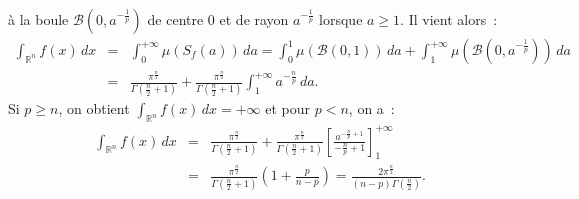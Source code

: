 {\begin{enumerate}
{\`a la boule $\mathcal{B}(0, a^{-\frac{1}{p}})$ de centre 0 et de
rayon $a^{-\frac{1}{p}}$ lorsque $a\geq 1$. Il vient alors~:
\begin{eqnarray*}
\int_{\mathbb{R}^{n}} f(x)\,dx &=& \int_{0}^{+\infty}
\mu\left(S_{f}(a)\right)\,da = \int_{0}^{1}
\mu\left(\mathcal{B}(0,1) \right)\,da + \int_{1}^{+\infty}
\mu\left(\mathcal{B}(0, a^{-\frac{1}{p}})\right)\,da\\
& = & \frac{\pi^{\frac{n}{2}}}{\Gamma\left(\frac{n}{2}+1\right)} +
\frac{\pi^{\frac{n}{2}}}{\Gamma\left(\frac{n}{2}+1\right)}\int_{1}^{+\infty}
a^{-\frac{n}{p}}\,da.
\end{eqnarray*}
Si $p\geq n$, on obtient $\int_{\mathbb{R}^{n}} f(x)\,dx =+\infty$
et pour $p<n$, on a~:
\begin{eqnarray*}
\int_{\mathbb{R}^{n}} f(x)\,dx & =
&\frac{\pi^{\frac{n}{2}}}{\Gamma\left(\frac{n}{2}+1\right)} +
\frac{\pi^{\frac{n}{2}}}{\Gamma\left(\frac{n}{2}+1\right)}\left[\frac{a^{-\frac{n}{p}+1}}{-\frac{n}{p}+1}\right]_{1}^{+\infty}\\
&=&\frac{\pi^{\frac{n}{2}}}{\Gamma\left(\frac{n}{2}+1\right)}\left(1
+ \frac{p}{n-p} \right) = \frac{2\pi^{\frac{n}{2}}}{(n -
p)\Gamma\left(\frac{n}{2}\right)}.
\end{eqnarray*}}
\end{enumerate}
}
